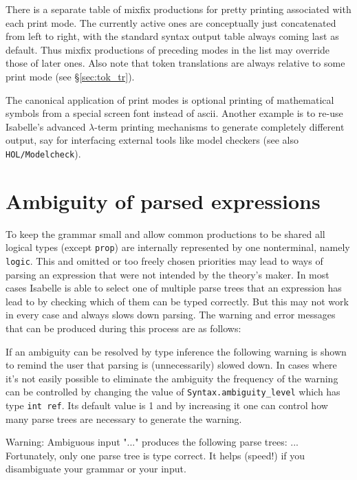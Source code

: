 There is a separate table of mixfix productions for pretty printing
associated with each print mode. The currently active ones are
conceptually just concatenated from left to right, with the standard
syntax output table always coming last as default.  Thus mixfix
productions of preceding modes in the list may override those of later
ones.  Also note that token translations are always relative to some
print mode (see \S\ref{sec:tok_tr}).

\medskip The canonical application of print modes is optional printing
of mathematical symbols from a special screen font instead of {\sc
  ascii}. Another example is to re-use Isabelle's advanced
$\lambda$-term printing mechanisms to generate completely different
output, say for interfacing external tools like model checkers (see
also \texttt{HOL/Modelcheck}).



\section{Ambiguity of parsed expressions} \label{sec:ambiguity}

To keep the grammar small and allow common productions to be shared
all logical types (except {\tt prop}) are internally represented
by one nonterminal, namely {\tt logic}. This and omitted or too freely
chosen priorities may lead to ways of parsing an expression that were
not intended by the theory's maker. In most cases Isabelle is able to
select one of multiple parse trees that an expression has lead
to by checking which of them can be typed correctly. But this may not
work in every case and always slows down parsing.
The warning and error messages that can be produced during this process are
as follows:

If an ambiguity can be resolved by type inference the following
warning is shown to remind the user that parsing is (unnecessarily)
slowed down. In cases where it's not easily possible to eliminate the
ambiguity the frequency of the warning can be controlled by changing
the value of {\tt Syntax.ambiguity_level} which has type {\tt int
ref}. Its default value is 1 and by increasing it one can control how
many parse trees are necessary to generate the warning.

\begin{ttbox}
{\out Warning: Ambiguous input "..."}
{\out produces the following parse trees:}
{\out ...}
{\out Fortunately, only one parse tree is type correct.}
{\out It helps (speed!) if you disambiguate your grammar or your input.}
\end{ttbox}

